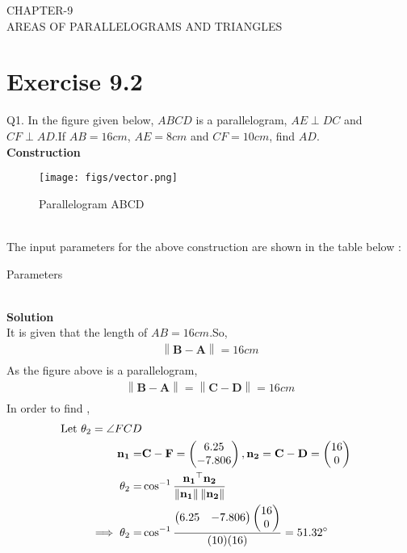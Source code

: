 \documentclass{article}
\providecommand{\norm}[1]{\left\lVert#1\right\rVert}
\newcommand{\myvec}[1]{\ensuremath{\begin{pmatrix}#1\end{pmatrix}}}
\let\vec\mathbf
\begin{document}
\begin{center}
        \textbf\large{CHAPTER-9 \\ AREAS OF PARALLELOGRAMS AND TRIANGLES}
\end{center}
\section{Exercise 9.2}
Q1. In the figure given below, $ABCD$ is a parallelogram, $AE \perp DC$ and $CF \perp AD$.If $AB = 16cm$, $AE = 8cm$ and $CF = 10cm$, find $AD$.\\
\textbf{Construction}\\
\begin{figure}[h]
 \begin{center}
  \texttt{[image: figs/vector.png]}
 \end{center}
 \caption{Parallelogram ABCD}
 \label{fig:Fig}
\end{figure}\\
\pagebreak
The input parameters for the above construction are shown in the table below : \\
\begin{table}[h]
	\centering
	
	\caption{Parameters}
	\label{tab:table1}
\end{table}\\
\textbf{Solution}\\
It is given that the length of $AB = 16cm$.So,\\
\begin{align}
	\norm{\vec{B} - \vec{A}} = 16cm \\
\end{align}
As the figure above is a parallelogram,\\
\begin{align}
	\norm{\vec{B} - \vec{A}} = \norm{\vec{C} - \vec{D}} = 16cm
	\label{eq:1}\\
\end{align}
\vspace{5mm}
In order to find ,\\
\begin{align}
	\text{ Let }\theta_2 = \angle{FCD}\\
\vec{n_1} = &\vec{C} - \vec{F} = \myvec{6.25\\-7.806}, \vec{n_2} = \vec{C} - \vec{D} = \myvec{16\\0} \\
\theta_2 = &\cos^{-1}\frac{\vec{n_1}^\top\vec{n_2}}{\norm{\vec{n_1}}\norm{\vec{n_2}}} \\
	\implies\theta_2 = &\cos^{-1}\frac{\myvec{6.25&-7.806}\myvec{16\\0}}{(10)(16)} = 51.32\degree
\end{align}
\end{document}
